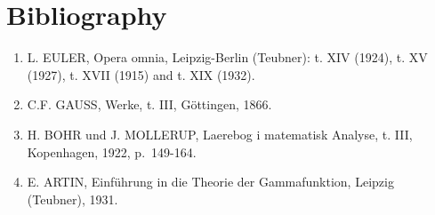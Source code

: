 \section*{Bibliography}
{}

\begin{enumerate}
\def\labelenumi{(\Roman{enumi})}
\item
  L. EULER, Opera omnia, Leipzig-Berlin (Teubner): t. XIV (1924), t. XV (1927), t. XVII (1915) and t. XIX (1932).
\item
  C.F. GAUSS, Werke, t. III, Göttingen, 1866.
\item
  H. BOHR und J. MOLLERUP, Laerebog i matematisk Analyse, t. III, Kopenhagen, 1922, p.~149-164.
\item
  E. ARTIN, Einführung in die Theorie der Gammafunktion, Leipzig (Teubner), 1931.
\end{enumerate}

\backmatter
